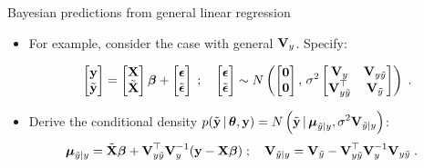 \begin{frame}{Bayesian predictions from general linear regression}
 
 \begin{itemize}\setlength{\itemsep}{0.cm}  
  \item For example, consider the case with general $\textbf{V}_y$. Specify:

  \begin{align*}
 \begin{bmatrix} \textbf{y} \\ \tilde{\textbf{y}} \end{bmatrix} = \begin{bmatrix} \textbf{X} \\ \tilde{\textbf{X}} \end{bmatrix}\mbox{\boldmath $ \beta $} + \begin{bmatrix} \mbox{\boldmath $\epsilon$} \\ \tilde{\mbox{\boldmath $\epsilon$}} \end{bmatrix}\;;\quad \begin{bmatrix} \mbox{\boldmath $\epsilon$} \\ \tilde{\mbox{\boldmath $\epsilon$}} \end{bmatrix} \sim N\left(\begin{bmatrix} \textbf{0} \\ \textbf{0} \end{bmatrix},\, \sigma^2\begin{bmatrix} \textbf{V}_{y} & \textbf{V}_{y\tilde{y}} \\ \textbf{V}_{y\tilde{y}}^{\top} & \textbf{V}_{\tilde{y}} \end{bmatrix}\right)\; .  
\end{align*}
  
  \item Derive the conditional density $\displaystyle p(\tilde{\textbf{y}}\,|\, \mbox{\boldmath $ \theta $}, \textbf{y}) = N\left(\tilde{\textbf{y}}\,|\, \mbox{\boldmath $\mu$}_{\tilde{y}|y}, \sigma^2 \textbf{V}_{\tilde{y}|y}\right)$:
\begin{align*}
 \mbox{\boldmath $\mu$}_{\tilde{y}|y} &= \tilde{\textbf{X}}\mbox{\boldmath $ \beta $} + \textbf{V}_{y\tilde{y}}^{\top}\textbf{V}_y^{-1}(\textbf{y}-\textbf{X}\mbox{\boldmath $ \beta $})\;;\quad \textbf{V}_{\tilde{y}|y} = \textbf{V}_{\tilde{y}} -  \textbf{V}_{y\tilde{y}}^{\top}\textbf{V}_y^{-1}\textbf{V}_{y\tilde{y}}\;.
\end{align*}


\end{itemize}
\end{frame}

